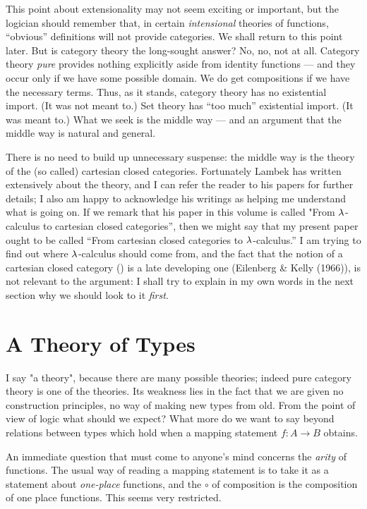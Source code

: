 This point about extensionality may not seem exciting or im­portant, but the logician should remember that, in certain {\it intensional} theories of functions, ``obvious'' definitions will not provide categories. We shall return to this point later. But is category theory the long-sought answer? No, no, not at all. Category theory {\it pure} provides nothing explicitly aside from identity functions --- and they occur only if we have some possible domain. We do get compositions if we have the neces­sary terms. Thus, as it stands, category theory has no existential import. (It was not meant to.) Set theory has ``too much'' existential import. (It was meant to.) What we seek is the middle way --- and an argument that the middle way is natural and general.

There is no need to build up unnecessary suspense: the middle way is the theory of the (so called) cartesian closed categories.
Fortunately Lambek has written extensively about the theory, and I can refer the reader to his papers for fur­ther details; I also am happy to acknowledge his writings as helping me understand what is going on. If we remark that his paper in this volume is called "From $\lambda$-calculus to cartesian closed categories'', then we might say that my present paper ought to be called ``From cartesian closed categories to $\lambda$-calculus.''
I am trying to find out where $\lambda$-calculus should come from, and the fact that the notion of a cartesian closed category (\ccc) is a late developing one (Eilenberg \& Kelly (1966)), is not relevant to the argument: I shall try to explain in my own words in the next section why we should look to it {\it first}.

\section{A Theory of Types}

I say "a theory", because there are many possible theories; indeed pure category theory is one of the theories.
Its weak­ness lies in the fact that we are given no construction principles, no way of making new types from old. From the point of view of logic what should we expect? What more do we want to say beyond relations between types which hold when a mapping statement $f : A\to	B$ obtains.

An immediate question that must come to anyone's mind con­cerns the {\it arity} of functions. The usual way of reading a map­ping statement is to take it as a statement about {\it one-place} functions, and the $\circ$ of composition is the composition of one­ place functions. This seems very restricted.

